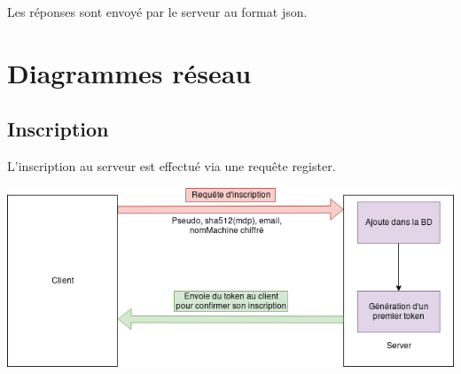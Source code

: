 \documentclass[oneside]{report}
\begin{document}
	\par Les réponses sont envoyé par le serveur au format json.\\

	\chapter{Diagrammes réseau}
	\vspace{2cm}
	\section{Inscription}{
		\par L'inscription au serveur est effectué via une requête register.\\
		\vspace{.5cm}
		\begin{center}
			\includegraphics[scale=.5]{reseau_register}
		\end{center}
	}
\end{document}
